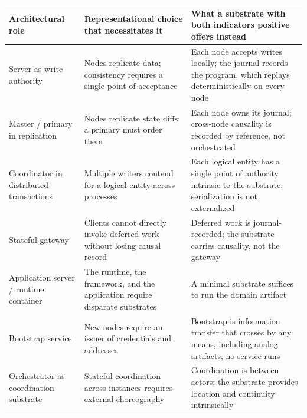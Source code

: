 \documentclass[
]{article}
\newcounter{none} %
\begin{document}
{\def\LTcaptype{none} %
\begin{longtable}[]{@{}
  >{\raggedright\arraybackslash}p{}
  >{\raggedright\arraybackslash}p{}
  >{\raggedright\arraybackslash}p{}@{}}
\toprule\noalign{}
\begin{minipage}[b]{\linewidth}\raggedright
Architectural role
\end{minipage} & \begin{minipage}[b]{\linewidth}\raggedright
Representational choice that necessitates it
\end{minipage} & \begin{minipage}[b]{\linewidth}\raggedright
What a substrate with both indicators positive offers instead
\end{minipage} \\
\midrule\noalign{}
\endhead
\bottomrule\noalign{}
\endlastfoot
Server as write authority & Nodes replicate data; consistency requires a
single point of acceptance & Each node accepts writes locally; the
journal records the program, which replays deterministically on every
node \\
Master / primary in replication & Nodes replicate state diffs; a primary
must order them & Each node owns its journal; cross-node causality is
recorded by reference, not orchestrated \\
Coordinator in distributed transactions & Multiple writers contend for a
logical entity across processes & Each logical entity has a single point
of authority intrinsic to the substrate; serialization is not
externalized \\
Stateful gateway & Clients cannot directly invoke deferred work without
losing causal record & Deferred work is journal-recorded; the substrate
carries causality, not the gateway \\
Application server / runtime container & The runtime, the framework, and
the application require disparate substrates & A minimal substrate
suffices to run the domain artifact \\
Bootstrap service & New nodes require an issuer of credentials and
addresses & Bootstrap is information transfer that crosses by any means,
including analog artifacts; no service runs \\
Orchestrator as coordination substrate & Stateful coordination across
instances requires external choreography & Coordination is between
actors; the substrate provides location and continuity intrinsically \\
\end{longtable}
}
\end{document}
